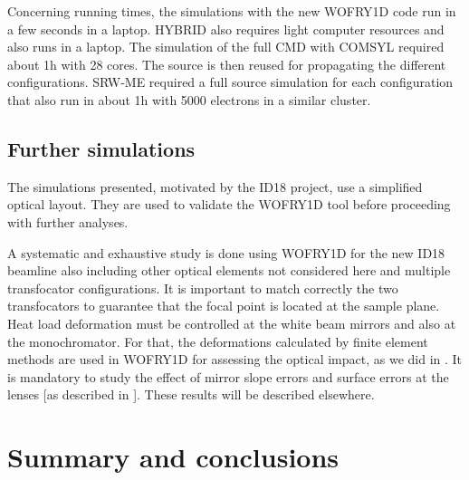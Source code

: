 \documentclass{iucr}              %
\begin{document}
Concerning running times, the simulations with the new WOFRY1D code run in a few seconds in a laptop.
HYBRID also requires light computer resources and also runs in a laptop. 
The simulation of the full CMD with COMSYL required about 1h with 28 cores. The source is then reused for propagating the different configurations. SRW-ME required a full source simulation for each configuration that also run in about 1h with 5000 electrons in a similar cluster. 


\subsection{Further simulations}
\label{sec:discussion}

The simulations presented, motivated by the ID18 project, use a simplified optical layout. They are used to validate the WOFRY1D tool before proceeding with further analyses. 

A systematic and exhaustive study is done using WOFRY1D for the new ID18 beamline also including other optical elements not considered here and multiple transfocator configurations. It is important to match correctly the two transfocators to guarantee that the focal point is located at the sample plane. Heat load deformation must be controlled at the white beam mirrors and also at the monochromator. For that, the deformations calculated by finite element methods are used in WOFRY1D for assessing the optical impact, as we did in \cite{srioLBL}. It is mandatory to study the effect of mirror slope errors and surface errors at the lenses [as described in \cite{Celestre:mo5214}]. These results will be described elsewhere.




\section{Summary and conclusions}
\label{sec:summary}
\end{document}

